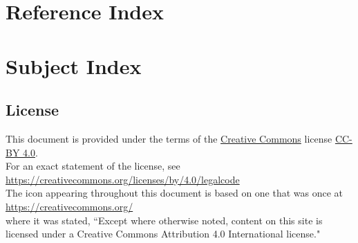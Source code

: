 ﻿%

\section*{Reference Index}
\begin{multicols}{3}

\end{multicols}
\section*{Subject Index}
\begin{multicols}{3}
  
\end{multicols}
\subsection*{License}
This document is provided under the terms of 
the \href{https://creativecommons.org/}{Creative Commons} license \href{https://creativecommons.org/licenses/by/4.0/legalcode}{CC-BY 4.0}.
\\For an exact statement of the license, see 
\\\indentx\url{https://creativecommons.org/licenses/by/4.0/legalcode}
\\
The icon 
appearing throughout this document is based on one that was once at 
\\\indentx\url{https://creativecommons.org/}\\
where it was stated, 
``Except where otherwise noted, content on this site is licensed under a Creative Commons Attribution 4.0 International license."
